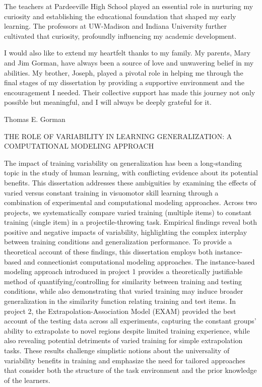 \documentclass[
  11pt,
  letterpaper,
]{article}
\begin{document}
The teachers at Pardeeville High School played an essential role in
nurturing my curiosity and establishing the educational foundation that
shaped my early learning. The professors at UW-Madison and Indiana
University further cultivated that curiosity, profoundly influencing my
academic development.

I would also like to extend my heartfelt thanks to my family. My
parents, Mary and Jim Gorman, have always been a source of love and
unwavering belief in my abilities. My brother, Joseph, played a pivotal
role in helping me through the final stages of my dissertation by
providing a supportive environment and the encouragement I needed. Their
collective support has made this journey not only possible but
meaningful, and I will always be deeply grateful for it.

\newpage

\begin{centering}

{Thomas E. Gorman}

{THE ROLE OF VARIABILITY IN LEARNING GENERALIZATION: A COMPUTATIONAL MODELING APPROACH}

\end{centering}

The impact of training variability on generalization has been a
long-standing topic in the study of human learning, with conflicting
evidence about its potential benefits. This dissertation addresses these
ambiguities by examining the effects of varied versus constant training
in visuomotor skill learning through a combination of experimental and
computational modeling approaches. Across two projects, we
systematically compare varied training (multiple items) to constant
training (single item) in a projectile-throwing task. Empirical findings
reveal both positive and negative impacts of variability, highlighting
the complex interplay between training conditions and generalization
performance. To provide a theoretical account of these findings, this
dissertation employs both instance-based and connectionist computational
modeling approaches. The instance-based modeling approach introduced in
project 1 provides a theoretically justifiable method of
quantifying/controlling for similarity between training and testing
conditions, while also demonstrating that varied training may induce
broader generalization in the similarity function relating training and
test items. In project 2, the Extrapolation-Association Model (EXAM)
provided the best account of the testing data across all experiments,
capturing the constant groups' ability to extrapolate to novel regions
despite limited training experience, while also revealing potential
detriments of varied training for simple extrapolation tasks. These
results challenge simplistic notions about the universality of
variability benefits in training and emphasize the need for tailored
approaches that consider both the structure of the task environment and
the prior knowledge of the learners.
\end{document}
